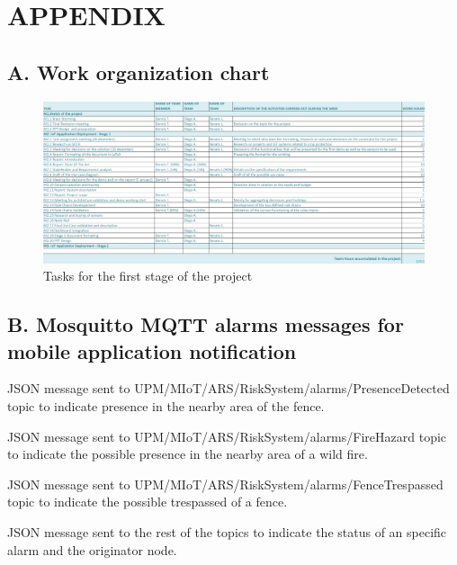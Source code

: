 \section{APPENDIX}
\subsection*{A. Work organization chart}
\begin{figure}[H]
    \centering
    \includegraphics[width=1\textwidth]{./images/Tasks.png}
    \caption{Tasks for the first stage of the project}
    \label{fig:tasks}
\end{figure}

\subsection*{B. Mosquitto MQTT alarms messages for mobile application notification}
JSON message sent to UPM/MIoT/ARS/RiskSystem/alarms/PresenceDetected topic to indicate presence in the nearby area of the fence.


JSON message sent to UPM/MIoT/ARS/RiskSystem/alarms/FireHazard topic to indicate the possible presence in the nearby area of a wild fire.

\clearpage
JSON message sent to UPM/MIoT/ARS/RiskSystem/alarms/FenceTrespassed topic to indicate the possible trespassed of a fence.


JSON message sent to the rest of the topics to indicate the status of an specific alarm and the originator node.


